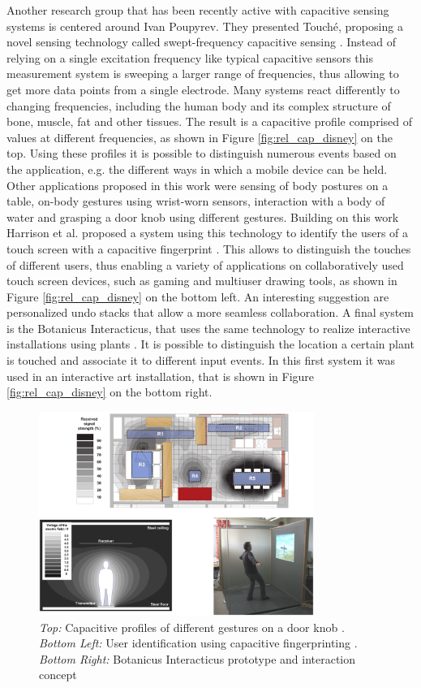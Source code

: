 Another research group that has been recently active with capacitive sensing systems is centered around Ivan Poupyrev. They presented Touché, proposing a novel sensing technology called swept-frequency capacitive sensing \cite{Sato2012}. Instead of relying on a single excitation frequency like typical capacitive sensors this measurement system is sweeping a larger range of frequencies, thus allowing to get more data points from a single electrode. Many systems react differently to changing frequencies, including the human body and its complex structure of bone, muscle, fat and other tissues. The result is a capacitive profile comprised of values at different frequencies, as shown in Figure \ref{fig:rel_cap_disney} on the top. Using these profiles it is possible to distinguish numerous events based on the application, e.g. the different ways in which a mobile device can be held. Other applications proposed in this work were sensing of body postures on a table, on-body gestures using wrist-worn sensors, interaction with a body of water and grasping a door knob using different gestures. Building on this work Harrison et al. proposed a system using this technology to identify the users of a touch screen with a capacitive fingerprint \cite{harrison2012capacitive}. This allows to distinguish the touches of different users, thus enabling a variety of applications on collaboratively used touch screen devices, such as gaming and multiuser drawing tools, as shown in Figure \ref{fig:rel_cap_disney} on the bottom left. An interesting suggestion are personalized undo stacks that allow a more seamless collaboration. A final system is the Botanicus Interacticus, that uses the same technology to realize interactive installations using plants  \cite{poupyrev2012botanicus}. It is possible to distinguish the location a certain plant is touched and associate it to different input events. In this first system it was used in an interactive art installation, that is shown in Figure \ref{fig:rel_cap_disney} on the bottom right.
\begin{figure}[h]
\centering
\includegraphics[width=0.8\textwidth]{images/rel_cap_tampere}
\caption{\emph{Top:} Capacitive profiles of different gestures on a door knob \cite{Sato2012}. \emph{Bottom Left:} User identification using capacitive fingerprinting \cite{harrison2012capacitive}. \emph{Bottom Right:} Botanicus Interacticus prototype and interaction concept \cite{poupyrev2012botanicus}} 
\label{fig:rel_cap_tampere}
\end{figure}
